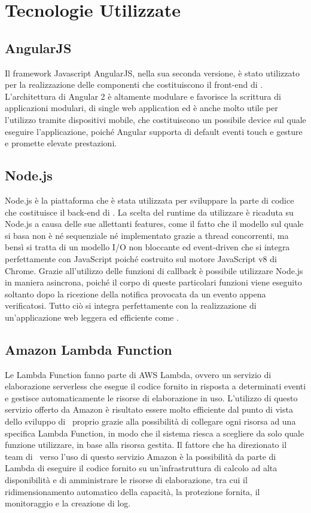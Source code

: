 \documentclass[../ManualeSviluppatore_v2.0.0.tex]{subfiles}
\begin{document}
\section{Tecnologie Utilizzate}

	\subsection{AngularJS}
		Il \gls{framework} Javascript AngularJS, nella sua seconda versione, è stato utilizzato per la realizzazione delle componenti che costituiscono il \gls{front-end} di \atavi. L'architettura di Angular 2 è altamente modulare e favorisce la scrittura di applicazioni modulari, di single web application ed è anche molto utile per l'utilizzo tramite dispositivi mobile, che costituiscono un possibile device sul quale eseguire l'applicazione, poiché Angular supporta di default eventi touch e gesture e promette elevate prestazioni.
	\subsection{Node.js}
		Node.js è la piattaforma che è stata utilizzata per sviluppare la parte di codice che costituisce il back-end di \atavi. La scelta del \gls{runtime} da utilizzare è ricaduta su Node.js a causa delle sue allettanti \gls{features}, come il fatto che il modello sul quale si basa non è né sequenziale né implementato grazie a \gls{thread} concorrenti, ma bensì si tratta di un \gls{modello I/O} non bloccante ed \gls{event-driven} che si integra perfettamente con JavaScript poiché costruito sul motore JavaScript v8 di Chrome. Grazie all'utilizzo delle \gls{funzioni di callback} è possibile utilizzare Node.js in maniera \gls{asincrona}, poiché il corpo di queste particolari funzioni viene eseguito soltanto dopo la ricezione della notifica provocata da un evento appena verificatosi. Tutto ciò si integra perfettamente con la realizzazione di un'applicazione web leggera ed efficiente come \atavi.
	\subsection{Amazon Lambda Function}
		Le Lambda Function fanno parte di AWS Lambda, ovvero un servizio di elaborazione \gls{serverless} che esegue il codice fornito in risposta a determinati eventi e gestisce automaticamente le risorse di elaborazione in uso. L'utilizzo di questo servizio offerto da Amazon è risultato essere molto efficiente dal punto di vista dello sviluppo di \atavi\ proprio grazie alla possibilità di collegare ogni risorsa ad una specifica Lambda Function, in modo che il sistema riesca a scegliere da solo quale funzione utilizzare, in base alla risorsa gestita. Il fattore che ha direzionato il team di \kpanic\ verso l'uso di questo servizio Amazon è la possibilità da parte di Lambda di eseguire il codice fornito su un'infrastruttura di calcolo ad alta disponibilità e di amministrare le risorse di elaborazione, tra cui il ridimensionamento automatico della capacità, la protezione fornita, il monitoraggio e la creazione di log.
\end{document}
